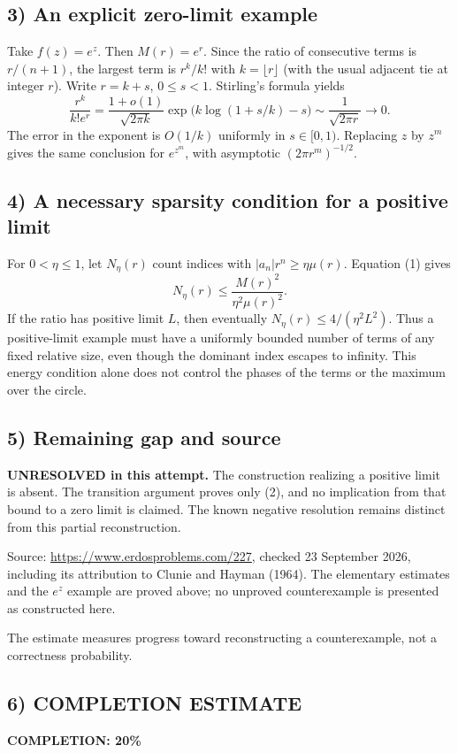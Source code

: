 \subsection*{3) An explicit zero-limit example}
Take $f(z)=e^z$. Then $M(r)=e^r$. Since the ratio of consecutive terms is $r/(n+1)$, the largest term is $r^k/k!$ with $k=\lfloor r\rfloor$ (with the usual adjacent tie at integer $r$). Write $r=k+s$, $0\le s<1$. Stirling's formula yields
\[
 \frac{r^k}{k!e^r}
 =\frac{1+o(1)}{\sqrt{2\pi k}}
   \exp\bigl(k\log(1+s/k)-s\bigr)
 \sim\frac1{\sqrt{2\pi r}}\longrightarrow0.
\]
The error in the exponent is $O(1/k)$ uniformly in $s\in[0,1)$. Replacing $z$ by $z^m$ gives the same conclusion for $e^{z^m}$, with asymptotic $(2\pi r^m)^{-1/2}$.

\subsection*{4) A necessary sparsity condition for a positive limit}
For $0<\eta\le1$, let $N_\eta(r)$ count indices with $|a_n|r^n\ge\eta\mu(r)$. Equation (1) gives
\[
 N_\eta(r)\le\frac{M(r)^2}{\eta^2\mu(r)^2}.
\]
If the ratio has positive limit $L$, then eventually $N_\eta(r)\le4/(\eta^2L^2)$. Thus a positive-limit example must have a uniformly bounded number of terms of any fixed relative size, even though the dominant index escapes to infinity. This energy condition alone does not control the phases of the terms or the maximum over the circle.

\subsection*{5) Remaining gap and source}
\textbf{UNRESOLVED in this attempt.} The construction realizing a positive limit is absent. The transition argument proves only (2), and no implication from that bound to a zero limit is claimed. The known negative resolution remains distinct from this partial reconstruction.

Source: \url{https://www.erdosproblems.com/227}, checked 23 September 2026, including its attribution to Clunie and Hayman (1964). The elementary estimates and the $e^z$ example are proved above; no unproved counterexample is presented as constructed here.

The estimate measures progress toward reconstructing a counterexample, not a correctness probability.
\subsection*{6) COMPLETION ESTIMATE}
\textbf{COMPLETION: 20\%}
